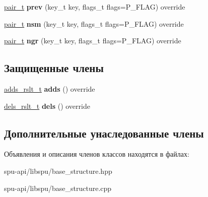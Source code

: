 \begin{DoxyCompactItemize}
\hyperlink{struct_s_p_u_1_1pair__containter}{pair\+\_\+t} {\bfseries prev} (key\+\_\+t key, flags\+\_\+t flags=P\+\_\+\+F\+L\+AG) override
\item 
\mbox{\label{class_s_p_u_1_1_base_structure_aca450d9d4de8a88d6dcbc567513f1f8e}} 
\hyperlink{struct_s_p_u_1_1pair__containter}{pair\+\_\+t} {\bfseries nsm} (key\+\_\+t key, flags\+\_\+t flags=P\+\_\+\+F\+L\+AG) override
\item 
\mbox{\label{class_s_p_u_1_1_base_structure_a58d7da2df970b961da73a36de2e3c026}} 
\hyperlink{struct_s_p_u_1_1pair__containter}{pair\+\_\+t} {\bfseries ngr} (key\+\_\+t key, flags\+\_\+t flags=P\+\_\+\+F\+L\+AG) override
\end{DoxyCompactItemize}
\subsection*{Защищенные члены}
\begin{DoxyCompactItemize}
\item 
\mbox{\label{class_s_p_u_1_1_base_structure_a35f88e6d609bfb752b7f6a630938b322}} 
\hyperlink{structrsltfrmt__0}{adds\+\_\+rslt\+\_\+t} {\bfseries adds} () override
\item 
\mbox{\label{class_s_p_u_1_1_base_structure_a9c53aadd1b606fffc3aa72710e4b4d71}} 
\hyperlink{structrsltfrmt__1}{dels\+\_\+rslt\+\_\+t} {\bfseries dels} () override
\end{DoxyCompactItemize}
\subsection*{Дополнительные унаследованные члены}


Объявления и описания членов классов находятся в файлах\+:\begin{DoxyCompactItemize}
\item 
spu-\/api/libspu/base\+\_\+structure.\+hpp\item 
spu-\/api/libspu/base\+\_\+structure.\+cpp\end{DoxyCompactItemize}
